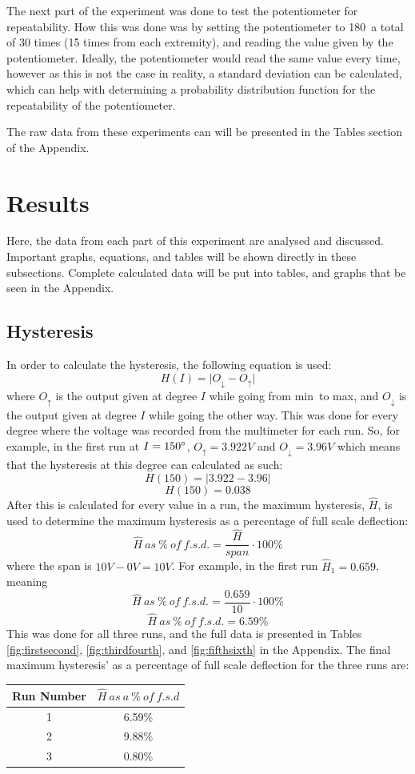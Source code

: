 \documentclass[a4,11pt]{article}
\begin{document}
The next part of the experiment was done to test the potentiometer for repeatability. How this was done was by setting the potentiometer to 180\degree\ a total of 30 times (15 times from each extremity), and reading the value given by the potentiometer. Ideally, the potentiometer would read the same value every time, however as this is not the case in reality, a standard deviation can be calculated, which can help with determining a probability distribution function for the repeatability of the potentiometer.

The raw data from these experiments can will be presented in the Tables section of the Appendix.
\section{Results}
Here, the data from each part of this experiment are analysed and discussed. Important graphs, equations, and tables will be shown directly in these subsections. Complete calculated data will be put into tables, and graphs that be seen in the Appendix.
\subsection{Hysteresis}
In order to calculate the hysteresis, the following equation is used:
$$H(I)=\lvert O_\downarrow-O_\uparrow\rvert$$
where $O_\uparrow$ is the output given at degree $I$ while going from min\degree\ to max\degree, and $O_\downarrow$ is the output given at degree $I$ while going the other way. This was done for every degree where the voltage was recorded from the multimeter for each run. So, for example, in the first run at $I=150\degree$, $O_\uparrow=3.922V$ and $O_\downarrow=3.96V$ which means that the hysteresis at this degree can calculated as such:
$$H(150)=\lvert 3.922-3.96\rvert$$
$$H(150)=0.038$$
After this is calculated for every value in a run, the maximum hysteresis, $\hat{H}$, is used to determine the maximum hysteresis as a percentage of full scale deflection:
$$\hat{H}\ as\ \%\ of\ f.s.d.=\frac{\hat{H}}{span}\cdot 100\%$$
where the span is $10V-0V=10V$. For example, in the first run $\hat{H}_1=0.659$, meaning
$$\hat{H}\ as\ \%\ of\ f.s.d.=\frac{0.659}{10}\cdot 100\%$$
$$\hat{H}\ as\ \%\ of\ f.s.d.=6.59\%$$
This was done for all three runs, and the full data is presented in Tables \ref{fig:firstsecond}, \ref{fig:thirdfourth}, and \ref{fig:fifthsixth} in the Appendix. The final maximum hysteresis' as a percentage of full scale deflection for the three runs are:
\begin{center}
	\begin{tabular}{c|c}
		Run Number & $\hat{H}\ as\ a\ \%\ of\ f.s.d$ \\
		\hline
		1 & 6.59\% \\
		2 & 9.88\% \\
		3 & 0.80\% \\
		\hline
	\end{tabular}
\end{center}
\end{document}
